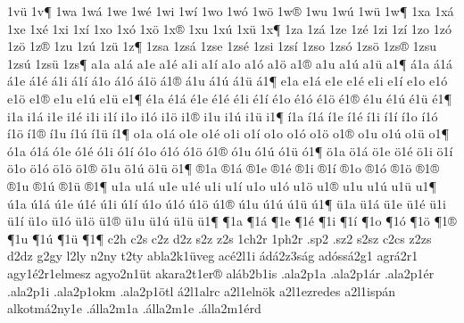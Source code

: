 {1v^^fc
1v^^b6
1wa
1w^^e1
1we
1w^^e9
1wi
1w^^ed
1wo
1w^^f3
1w^^f6
1w^^ae
1wu
1w^^fa
1w^^fc
1w^^b6
1xa
1x^^e1
1xe
1x^^e9
1xi
1x^^ed
1xo
1x^^f3
1x^^f6
1x^^ae
1xu
1x^^fa
1x^^fc
1x^^b6
1za
1z^^e1
1ze
1z^^e9
1zi
1z^^ed
1zo
1z^^f3
1z^^f6
1z^^ae
1zu
1z^^fa
1z^^fc
1z^^b6
1zsa
1zs^^e1
1zse
1zs^^e9
1zsi
1zs^^ed
1zso
1zs^^f3
1zs^^f6
1zs^^ae
1zsu
1zs^^fa
1zs^^fc
1zs^^b6
a1a
a1^^e1
a1e
a1^^e9
a1i
a1^^ed
a1o
a1^^f3
a1^^f6
a1^^ae
a1u
a1^^fa
a1^^fc
a1^^b6
^^e11a
^^e11^^e1
^^e11e
^^e11^^e9
^^e11i
^^e11^^ed
^^e11o
^^e11^^f3
^^e11^^f6
^^e11^^ae
^^e11u
^^e11^^fa
^^e11^^fc
^^e11^^b6
e1a
e1^^e1
e1e
e1^^e9
e1i
e1^^ed
e1o
e1^^f3
e1^^f6
e1^^ae
e1u
e1^^fa
e1^^fc
e1^^b6
^^e91a
^^e91^^e1
^^e91e
^^e91^^e9
^^e91i
^^e91^^ed
^^e91o
^^e91^^f3
^^e91^^f6
^^e91^^ae
^^e91u
^^e91^^fa
^^e91^^fc
^^e91^^b6
i1a
i1^^e1
i1e
i1^^e9
i1i
i1^^ed
i1o
i1^^f3
i1^^f6
i1^^ae
i1u
i1^^fa
i1^^fc
i1^^b6
^^ed1a
^^ed1^^e1
^^ed1e
^^ed1^^e9
^^ed1i
^^ed1^^ed
^^ed1o
^^ed1^^f3
^^ed1^^f6
^^ed1^^ae
^^ed1u
^^ed1^^fa
^^ed1^^fc
^^ed1^^b6
o1a
o1^^e1
o1e
o1^^e9
o1i
o1^^ed
o1o
o1^^f3
o1^^f6
o1^^ae
o1u
o1^^fa
o1^^fc
o1^^b6
^^f31a
^^f31^^e1
^^f31e
^^f31^^e9
^^f31i
^^f31^^ed
^^f31o
^^f31^^f3
^^f31^^f6
^^f31^^ae
^^f31u
^^f31^^fa
^^f31^^fc
^^f31^^b6
^^f61a
^^f61^^e1
^^f61e
^^f61^^e9
^^f61i
^^f61^^ed
^^f61o
^^f61^^f3
^^f61^^f6
^^f61^^ae
^^f61u
^^f61^^fa
^^f61^^fc
^^f61^^b6
^^ae1a
^^ae1^^e1
^^ae1e
^^ae1^^e9
^^ae1i
^^ae1^^ed
^^ae1o
^^ae1^^f3
^^ae1^^f6
^^ae1^^ae
^^ae1u
^^ae1^^fa
^^ae1^^fc
^^ae1^^b6
u1a
u1^^e1
u1e
u1^^e9
u1i
u1^^ed
u1o
u1^^f3
u1^^f6
u1^^ae
u1u
u1^^fa
u1^^fc
u1^^b6
^^fa1a
^^fa1^^e1
^^fa1e
^^fa1^^e9
^^fa1i
^^fa1^^ed
^^fa1o
^^fa1^^f3
^^fa1^^f6
^^fa1^^ae
^^fa1u
^^fa1^^fa
^^fa1^^fc
^^fa1^^b6
^^fc1a
^^fc1^^e1
^^fc1e
^^fc1^^e9
^^fc1i
^^fc1^^ed
^^fc1o
^^fc1^^f3
^^fc1^^f6
^^fc1^^ae
^^fc1u
^^fc1^^fa
^^fc1^^fc
^^fc1^^b6
^^b61a
^^b61^^e1
^^b61e
^^b61^^e9
^^b61i
^^b61^^ed
^^b61o
^^b61^^f3
^^b61^^f6
^^b61^^ae
^^b61u
^^b61^^fa
^^b61^^fc
^^b61^^b6
c2h
c2s
c2z  %
d2z
s2z
z2s
1ch2r
1ph2r
.sp2
.sz2
s2sz
c2cs
z2zs
d2dz
g2gy
l2ly
n2ny
t2ty
abla2k1^^fcveg
ac^^e92l1i
^^e1d^^e12z3s^^e1g
ad^^f3ss^^e12g1
agr^^e12r1
agy1^^e92r1elmesz
agyo2n1^^fct
akara2t1er^^ae
al^^e1b2b1is
.ala2p1a
.ala2p1^^e1r
.ala2p1^^e9r
.ala2p1i
.ala2p1okm
.ala2p1^^f6tl
^^e12l1alrc
a2l1eln^^f6k
a2l1ezredes
a2l1isp^^e1n
alkotm^^e12ny1e
.^^e1lla2m1a
.^^e1lla2m1e
.^^e1lla2m1^^e9rd
}
